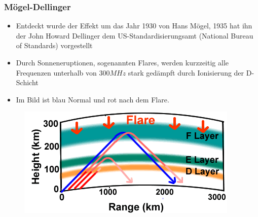 \begin{frame}
  \frametitle{Mögel-Dellinger}
  \begin{center}
    \begin{itemize}
      \item Entdeckt wurde der Effekt um das Jahr 1930 von Hans Mögel, 1935 hat ihn der John Howard Dellinger dem US-Standardisierungsamt (National Bureau of Standards) vorgestellt
      \item Durch Sonneneruptionen, sogenannten Flares, werden kurzzeitig alle Frequenzen unterhalb von $300MHz$ stark gedämpft durch Ionisierung der D-Schicht
      \item Im Bild ist blau Normal und rot nach dem Flare. \\[1em]
    \end{itemize}
    \begin{figure}
      \includegraphics[width=.6\textwidth,height=.3\textheight,keepaspectratio]{a08/FlareNPS.png}
    \end{figure}
  \end{center}
\end{frame}

